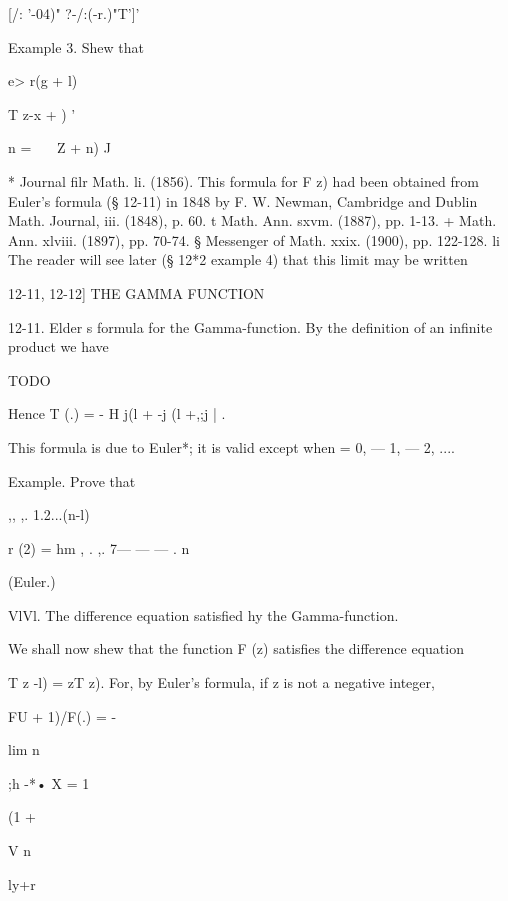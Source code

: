 [/: '-04)" ?-/:(-r.)"T']'



Example 3. Shew that

e> r(g + l)

T z-x + ) '



n = \ \ \ Z + n) J



* Journal filr Math. li. (1856). This formula for F z) had been
obtained from Euler's formula (§ 12-11) in 1848 by F. W. Newman,
Cambridge and Dublin Math. Journal, iii. (1848), p. 60. t Math. Ann.
sxvm. (1887), pp. 1-13. + Math. Ann. xlviii. (1897), pp. 70-74. §
Messenger of Math. xxix. (1900), pp. 122-128. li The reader will see
later (§ 12*2 example 4) that this limit may be written






12-11, 12-12] THE GAMMA FUNCTION

12-11. Elder s formula for the Gamma-function. By the definition of an
infinite product we have

TODO

Hence T (.) = - H j(l + -j (l +,;j | .

This formula is due to Euler*; it is valid except when = 0, — 1, — 2,
....



Example. Prove that



,, ,. 1.2...(n-l)

r (2) = hm , . ,. 7— — — . n\



(Euler.)



VlVl. The difference equation satisfied hy the Gamma-function.

We shall now shew that the function F (z) satisfies the difference
equation

T z -l) = zT z). For, by Euler's formula, if z is not a negative
integer,



FU + 1)/F(.) = -



lim n

;h -*• X = 1



(1 +

V n



ly+r



